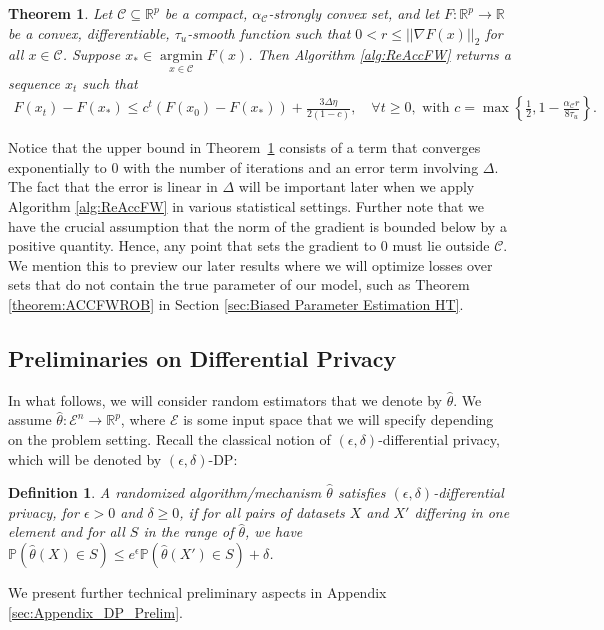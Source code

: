 \documentclass{article}
\newtheorem{theorem}{Theorem}
\newtheorem{definition}{Definition}[section]
\begin{document}
\begin{theorem}
\label{theorem:ACCFWV3}
Let $\mathcal{C} \subseteq \mathbb{R}^p$ be a compact, $\alpha_{\mathcal{C}}$-strongly convex set, and let $F: \mathbb{R}^p \rightarrow \mathbb{R}$ be a convex, differentiable, $\tau_u$-smooth function such that $0 < r \leq ||\nabla F(x)||_2$ for all $x \in \mathcal{C}$. Suppose $x_{*} \in \mathop{\arg\min}\limits_{x \in \mathcal{C}}F(x)$. Then Algorithm \ref{alg:ReAccFW} returns a sequence $x_t$ such that
\begin{align*}
F(x_t) - F(x_{*}) \leq c^t\left(F(x_0) - F(x_{*})\right) + \frac{3\Delta\eta}{2(1 - c)}, \quad \forall t \ge 0, \text{ with } c = \max\left\{\frac{1}{2}, 1 - \frac{\alpha_{\mathcal{C}} r}{8\tau_u}\right\}.
\end{align*}
\end{theorem}

Notice that the upper bound in Theorem~\ref{theorem:ACCFWV3} consists of a term that converges exponentially to $0$ with the number of iterations and an error term involving $\Delta$. The fact that the error is linear in $\Delta$ will be important later when we apply Algorithm \ref{alg:ReAccFW} in various statistical settings.
Further note that we have the crucial assumption that the norm of the gradient is bounded below by a positive quantity. Hence, any point that sets the gradient to 0 must lie outside $\mathcal{C}$. We mention this to preview our later results where we will optimize losses over sets that do not contain the true parameter of our model, such as Theorem \ref{theorem:ACCFWROB} in Section \ref{sec:Biased Parameter Estimation HT}.


\subsection{Preliminaries on Differential Privacy} 

In what follows, we will consider random estimators that we denote by $\hat{\theta}$. We assume $\hat{\theta} : \mathcal{E}^n \rightarrow \mathbb{R}^p$, where $\mathcal{E}$ is some input space that we will specify depending on the problem setting. Recall the classical notion of $(\epsilon, \delta)$-differential privacy, which will be denoted by $(\epsilon, \delta)$-DP:
\begin{definition}
\label{definition:DiffP}
A randomized algorithm/mechanism $\hat{\theta}$ satisfies $(\epsilon, \delta)$-differential privacy, for $\epsilon > 0$ and $\delta \geq 0$, if for all pairs of datasets $X$ and $X'$ differing in one element and for all $S$ in the range of $\hat{\theta}$, we have  $\mathbb{P}\left(\hat{\theta}(X) \in S \right) \leq e^\epsilon \mathbb{P}\left(\hat{\theta}(X') \in S \right) + \delta$.
\end{definition}
We present further technical preliminary aspects in Appendix \ref{sec:Appendix_DP_Prelim}.
\end{document}
